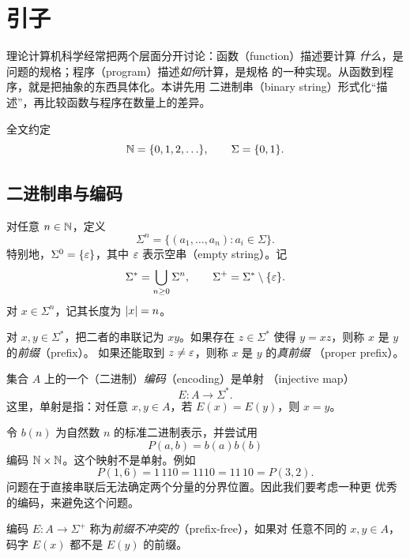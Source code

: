 \chapter{引子}
\label{chap:introduction}
\lecture
\label{lec:introduction}

理论计算机科学经常把两个层面分开讨论：函数（function）描述要计算
\emph{什么}，是问题的规格；程序（program）描述\emph{如何}计算，是规格
的一种实现。从函数到程序，就是把抽象的东西具体化。本讲先用
二进制串（binary string）形式化“描述”，再比较函数与程序在数量上的差异。

全文约定
\[
  \mathbb{N}=\{0,1,2,\ldots\},\qquad \Sigma=\{0,1\}.
\]

\section{二进制串与编码}

\begin{definition}[二进制串]
  \label{def:binary-string}
  对任意 $n\in\mathbb{N}$，定义
  \[
    \Sigma^n=\{(a_1,\ldots,a_n):a_i\in\Sigma\}.
  \]
  特别地，$\Sigma^0=\{\varepsilon\}$，其中 $\varepsilon$ 表示空串（empty string）。记
  \[
    \Sigma^*=\bigcup_{n\geq 0}\Sigma^n,
    \qquad
    \Sigma^+=\Sigma^*\setminus\{\varepsilon\}.
  \]
  对 $x\in\Sigma^n$，记其长度为 $\lvert x\rvert=n$。

  对 $x,y\in\Sigma^*$，把二者的串联记为 $xy$。如果存在
  $z\in\Sigma^*$ 使得 $y=xz$，则称 $x$ 是 $y$ 的\emph{前缀}（prefix）。
  如果还能取到 $z\neq\varepsilon$，则称 $x$ 是 $y$ 的\emph{真前缀}
  （proper prefix）。
\end{definition}

\begin{definition}[编码]
  \label{def:encoding}
  集合 $A$ 上的一个（二进制）\emph{编码}（encoding）是单射
  （injective map）
  \[
    E:A\longrightarrow\Sigma^*.
  \]
  这里，单射是指：对任意 $x,y\in A$，若 $E(x)=E(y)$，则 $x=y$。
\end{definition}

\begin{example}
  \label{ex:pair-encoding}
  令 $b(n)$ 为自然数 $n$ 的标准二进制表示，并尝试用
  \[
    P(a,b)=b(a)b(b)
  \]
  编码 $\mathbb{N}\times\mathbb{N}$。这个映射不是单射。例如
  \[
    P(1,6)=1\,110=1110=11\,10=P(3,2).
  \]
  问题在于直接串联后无法确定两个分量的分界位置。因此我们要考虑一种更
  优秀的编码，来避免这个问题。
\end{example}

\begin{definition}[前缀不冲突编码]
  \label{def:prefix-free}
  编码 $E:A\to\Sigma^+$ 称为\emph{前缀不冲突的}（prefix-free），如果对
  任意不同的 $x,y\in A$，码字 $E(x)$ 都不是 $E(y)$ 的前缀。
\end{definition}

